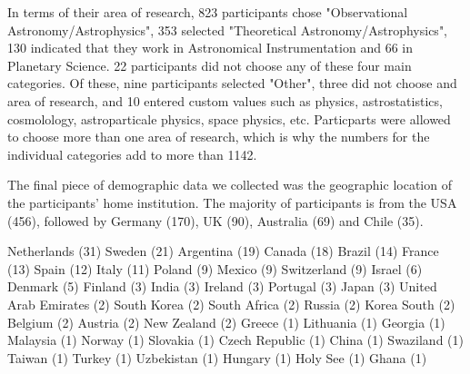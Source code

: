 In terms of their area of research, 823 participants chose "Observational Astronomy/Astrophysics", 353 selected "Theoretical Astronomy/Astrophysics", 130 indicated that they work in Astronomical Instrumentation and 66 in Planetary Science. 22 participants did not choose any of these four main categories. Of these, nine participants selected "Other", three did not choose and area of research, and 10 entered custom values such as physics, astrostatistics, cosmolology, astroparticale physics, space physics, etc. Particparts were allowed to choose more than one area of research, which is why the numbers for the individual categories add to more than 1142. 

The final piece of demographic data we collected was the geographic location of the participants' home institution. The majority of participants is from the USA (456), followed by Germany (170), UK (90), Australia (69) and Chile (35). 

             Netherlands     (31)
                  Sweden     (21)
               Argentina     (19)
                  Canada     (18)
                  Brazil     (14)
                  France     (13)
                   Spain     (12)
                   Italy     (11)
                  Poland      (9)
                  Mexico      (9)
             Switzerland      (9)
                  Israel      (6)
                 Denmark      (5)
                 Finland      (3)
                   India      (3)
                 Ireland      (3)
                Portugal      (3)
                   Japan      (3)
    United Arab Emirates      (2)
             South Korea      (2)
            South Africa      (2)
                  Russia      (2)
             Korea South      (2)
                 Belgium      (2)
                 Austria      (2)
             New Zealand      (2)
                  Greece      (1)
               Lithuania      (1)
                 Georgia      (1)
                Malaysia      (1)
                  Norway      (1)
                Slovakia      (1)
          Czech Republic      (1)
                   China      (1)
               Swaziland      (1)
                  Taiwan      (1)
                  Turkey      (1)
              Uzbekistan      (1)
                 Hungary      (1)
                Holy See      (1)
                   Ghana      (1)